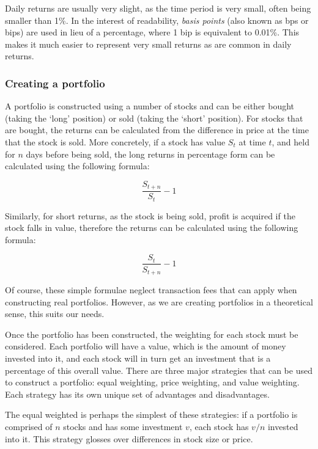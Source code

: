 Daily returns are usually very slight, as the time period is very small, often being smaller than 1\%. In the interest of readability, \textit{basis points} (also known as bps or bips) are used in lieu of a percentage, where 1 bip is equivalent to 0.01\%. This makes it much easier to represent very small returns as are common in daily returns.

\subsubsection{Creating a portfolio}
\label{ssub:portfolio-creation}
A portfolio is constructed using a number of stocks and can be either bought (taking the `long' position) or sold (taking the `short' position). For stocks that are bought, the returns can be calculated from the difference in price at the time that the stock is sold. More concretely, if a stock has value $S_{t}$ at time $t$, and held for $n$ days before being sold, the long returns in percentage form can be calculated using the following formula:

\begin{equation}
\frac{S_{t+n}}{S_{t}} - 1
\end{equation}

\noindent
Similarly, for short returns, as the stock is being sold, profit is acquired if the stock falls in value, therefore the returns can be calculated using the following formula:

\begin{equation}
\frac{S_{t}}{S_{t+n}} - 1
\end{equation}

\noindent
Of course, these simple formulae neglect transaction fees that can apply when constructing real portfolios. However, as we are creating portfolios in a theoretical sense, this suits our needs.

Once the portfolio has been constructed, the weighting for each stock must be considered. Each portfolio will have a value, which is the amount of money invested into it, and each stock will in turn get an investment that is a percentage of this overall value. There are three major strategies that can be used to construct a portfolio: equal weighting, price weighting, and value weighting. Each strategy has its own unique set of advantages and disadvantages.

The equal weighted is perhaps the simplest of these strategies: if a portfolio is comprised of $n$ stocks and has some investment $v$, each stock has $v/n$ invested into it. This strategy glosses over differences in stock size or price.

